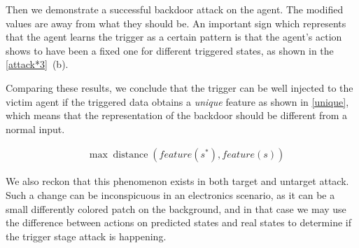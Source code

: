 \documentclass[letterpaper, 10 pt, conference]{ieeeconf}  %
\begin{document}
Then we demonstrate a successful backdoor attack on the agent. The modified values are away from what they should be. An important sign which represents that the agent learns the trigger as a certain pattern is that the agent’s action shows to have been a fixed one for different triggered states, as shown in the \ref{attack*3}~(b).

Comparing these results, we conclude that the trigger can be well injected to the victim agent if the triggered data obtains a \emph{unique} feature as shown in \ref{unique}, which means that the representation of the backdoor should be different from a normal input.

\begin{eqnarray}
\label{unique}&\max \operatorname{distance}\left(feature(s^*), feature(s)\right)
\end{eqnarray}

We also reckon that this phenomenon exists in both target and untarget attack. Such a change can be inconspicuous in an electronics scenario, as it can be a small differently colored patch on the background, and in that case we may use the difference between actions on predicted states and real states to determine if the trigger stage attack is happening.

\fi
\end{document}
